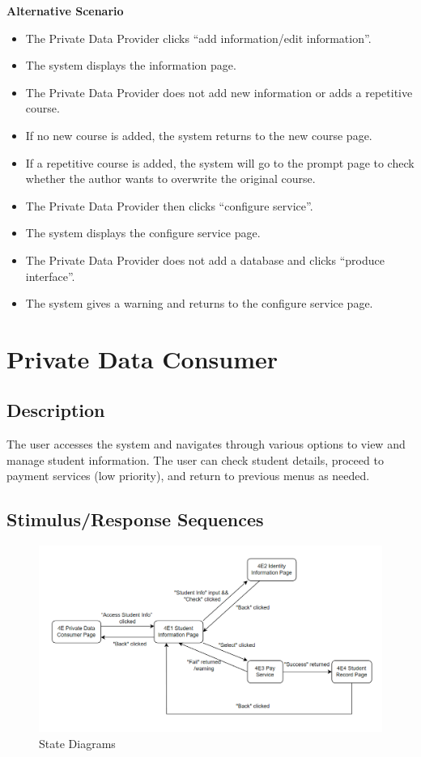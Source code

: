\textbf{Alternative Scenario}

\begin{itemize}
    \item The Private Data Provider clicks “add information/edit information”.
    \item The system displays the information page.
    \item The Private Data Provider does not add new information or adds a repetitive course.
    \item If no new course is added, the system returns to the new course page.
    \item If a repetitive course is added, the system will go to the prompt page to check whether the author wants to overwrite the original course.
    \item The Private Data Provider then clicks “configure service”.
    \item The system displays the configure service page.
    \item The Private Data Provider does not add a database and clicks “produce interface”.
    \item The system gives a warning and returns to the configure service page.
\end{itemize}

\section{Private Data Consumer}

\subsection{Description}
The user accesses the system and navigates through various options to view and manage student information. The user can check student details, proceed to payment services (low priority), and return to previous menus as needed.

\subsection{Stimulus/Response Sequences}
\begin{figure}[H]
    \centering
    \includegraphics[width=0.75\linewidth]{picture/WechatIMG1901.jpg}
    \caption{State Diagrams}
    \label{fig:enter-label}
\end{figure}

